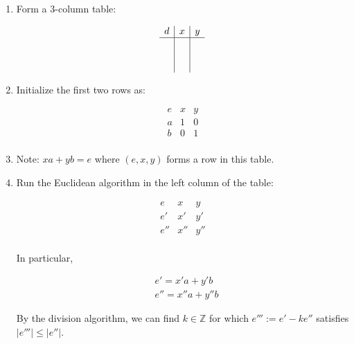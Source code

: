 \documentclass[11pt, draft]{article}
\begin{document}
\begin{enumerate}
    \item Form a 3-column table:

          \[
              \begin{array}{c|c|c}
                  d & x & y \\
                  \hline
                    &   &   \\
                    &   &   \\
                    &   &   \\
              \end{array}
          \]

    \item Initialize the first two rows as:

          \[
              \begin{array}{c|c|c}
                  e & x & y \\
                  \hline
                  a & 1 & 0 \\
                  b & 0 & 1 \\
              \end{array}
          \]

    \item Note: \(xa + yb = e\) where \((e, x, y)\) forms a row in this table.

    \item Run the Euclidean algorithm in the left column of the table:

          \[
              \begin{array}{c|c|c}
                  e   & x   & y   \\
                  \hline
                  e'  & x'  & y'  \\
                  e'' & x'' & y'' \\
              \end{array}
          \]

          In particular,

          \[
              \begin{aligned}
                   & e' = x'a + y'b    \\
                   & e'' = x''a + y''b
              \end{aligned}
          \]

          By the division algorithm, we can find \(k \in \mathbb{Z}\) for which \(e''' :=
          e' - k e''\) satisfies \(|e'''| \leq |e''|\).


\end{enumerate}
\end{document}
